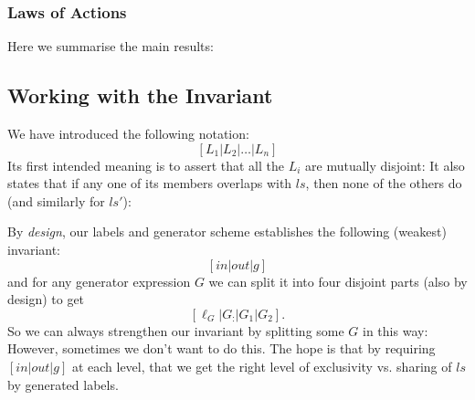 \subsubsection{Laws of Actions}
Here we summarise the main results:



\newpage
\subsection{Working with the Invariant}

We have introduced the following notation:
\[
  [ L_1 | L_2 | \dots | L_n ]
\]
Its first intended meaning is to assert that
all the $L_i$ are mutually disjoint:
It also states that if any one of its members overlaps with $ls$,
then none of the others do (and similarly for $ls'$):

By \emph{design}, our labels and generator scheme
establishes the following (weakest) invariant:
\[ [in|out|g]\]
and for any generator expression $G$ we can split it into
four disjoint parts (also by design) to get
\[  [\ell_G|G_{:}|G_1|G_2] . \]
So we can always strengthen our invariant by splitting some $G$
in this way:
However, sometimes we don't want to do this.
The hope is that by requiring $[in|out|g]$ at each level,
that we get the right level of exclusivity vs. sharing of $ls$
by generated labels.

